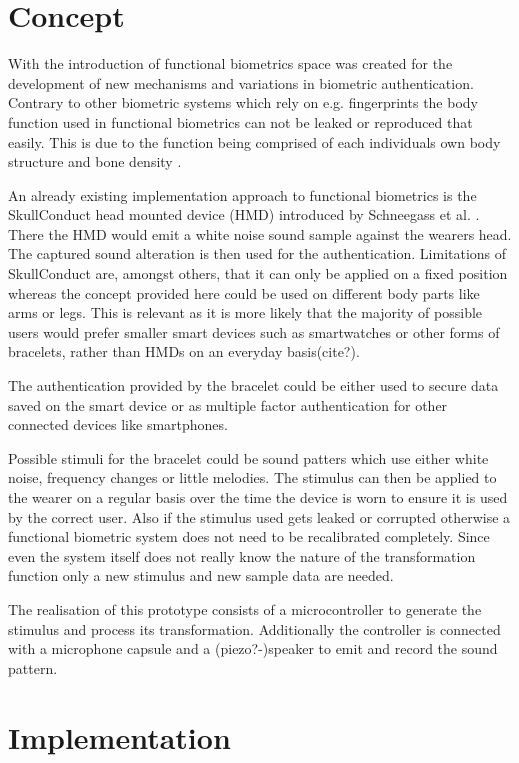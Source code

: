 \section{Concept}
With the introduction of functional biometrics space was created for the development of new mechanisms and variations in biometric authentication.
Contrary to other biometric systems which rely on e.g. fingerprints the body function used in functional biometrics can not be leaked or reproduced that easily.
This is due to the function being comprised of each individuals own body structure and bone density \cite{schneegass2020functbiometric}.

An already existing implementation approach to functional biometrics is the SkullConduct head mounted device (HMD) introduced by Schneegass et al. \cite{SkullConduct}.
There the HMD would emit a white noise sound sample against the wearers head.
The captured sound alteration is then used for the authentication.
Limitations of SkullConduct are, amongst others, that it can only be applied on a fixed position whereas the concept provided here could be used on different body parts like arms or legs.
This is relevant as it is more likely that the majority of possible users would prefer smaller smart devices such as smartwatches or other forms of bracelets, rather than HMDs on an everyday basis(cite?).
 
The authentication provided by the bracelet could be either used to secure data saved on the smart device or as multiple factor authentication for other connected devices like smartphones.

Possible stimuli for the bracelet could be sound patters which use either white noise, frequency changes or little melodies.
The stimulus can then be applied to the wearer on a regular basis over the time the device is worn to ensure it is used by the correct user.
Also if the stimulus used gets leaked or corrupted otherwise a functional biometric system does not need to be recalibrated completely.
Since even the system itself does not really know the nature of the transformation function only a new stimulus and new sample data are needed.

The realisation of this prototype consists of a microcontroller to generate the stimulus and process its transformation.
Additionally the controller is connected with a microphone capsule and a (piezo?-)speaker to emit and record the sound pattern.
 
\section{Implementation}
